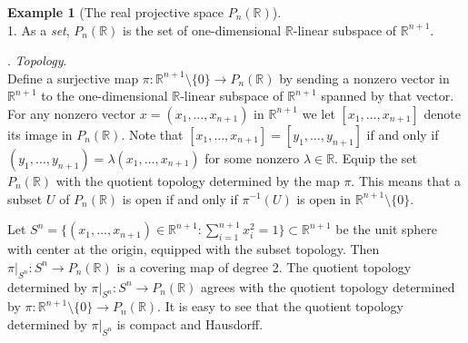 \documentclass{amsart}
\numberwithin{equation}{section}
\newcommand{\bR}{\mathbb{R}}
\theoremstyle{definition}
\newtheorem{example}[definition]{Example}
\theoremstyle{theorem}
\begin{document}
\begin{example}[{The real projective space $P_n(\bR)$}] \label{PR}$ $\\
1. As a {\em set},  
 $P_n(\bR)$ is the set of one-dimensional $\bR$-linear subspace of $\bR^{n+1}$.
 
\smallskip

. {\em Topology}.\\
Define a surjective map $\pi : \bR^{n+1}\setminus\{0\} \to P_n(\bR)$ by sending a nonzero vector 
in $\bR^{n+1}$ to the one-dimensional $\bR$-linear
subspace of $\bR^{n+1}$ spanned by that vector. 
For any nonzero vector $x=(x_1,\ldots,x_{n+1})$ in $\bR^{n+1}$ we let $[x_1,\ldots, x_{n+1}]$ denote its image in $P_n(\bR)$. 
Note that $[x_1,\ldots, x_{n+1}] = [y_1,\ldots, y_{n+1}]$ if and only if 
$(y_1,\ldots, y_{n+1})=\lambda (x_1,\ldots, x_{n+1})$ for some nonzero $\lambda\in \bR$.  
Equip the set $P_n(\bR)$ with the quotient topology determined by the map $\pi$.  This means that a subset $U$ 
of $P_n(\bR)$ is open if and only if $\pi^{-1}(U)$ is open in $\bR^{n+1} \setminus \{0\}$. 

Let $S^n=\{ (x_1,\ldots, x_{n+1})\in \bR^{n+1}: \sum_{i=1}^{n+1}x_i^2=1\}\subset 
\bR^{n+1}$
be the unit sphere with center at the origin, equipped with the subset topology. Then
$\pi|_{S^n}:S^n\to P_n(\bR)$ is a covering map of degree 2. The quotient
topology determined by $\pi|_{S^n}: S^n\to P_n(\bR)$  
agrees with the quotient  topology determined by $\pi:\bR^{n+1}\setminus\{0\}\to P_n(\bR)$. 
It is easy to see that the quotient topology determined by $\pi|_{S^n}$ is compact
and Hausdorff. 

\smallskip


\end{example}
\end{document}
